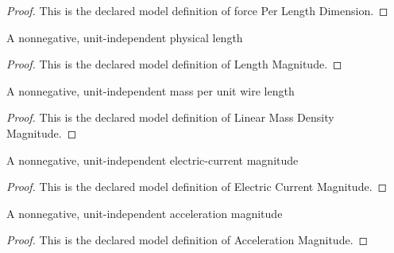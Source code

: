 \begin{proof}
  This is the declared model definition of force Per Length Dimension.
\end{proof}
\begin{definition}
  \label{def:physics:phyx-mini-0965:phyxminiproblems-problemphyxmini0965-lengthmagnitude}
  A nonnegative, unit-independent physical length
\end{definition}
\begin{proof}
  This is the declared model definition of Length Magnitude.
\end{proof}
\begin{definition}
  \label{def:physics:phyx-mini-0965:phyxminiproblems-problemphyxmini0965-linearmassdensitymagnitude}
  A nonnegative, unit-independent mass per unit wire length
\end{definition}
\begin{proof}
  This is the declared model definition of Linear Mass Density Magnitude.
\end{proof}
\begin{definition}
  \label{def:physics:phyx-mini-0965:phyxminiproblems-problemphyxmini0965-electriccurrentmagnitude}
  A nonnegative, unit-independent electric-current magnitude
\end{definition}
\begin{proof}
  This is the declared model definition of Electric Current Magnitude.
\end{proof}
\begin{definition}
  \label{def:physics:phyx-mini-0965:phyxminiproblems-problemphyxmini0965-accelerationmagnitude}
  A nonnegative, unit-independent acceleration magnitude
\end{definition}
\begin{proof}
  This is the declared model definition of Acceleration Magnitude.
\end{proof}
